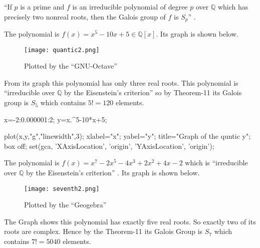 \begin{theorem}
``If \(p\) is a prime and \(f\) is an irreducible polynomial of degree \(p\) over \(\mathbb{Q}\) which has precisely two nonreal roots, then the Galois group of \(f\) is \(S_p\)'' \cite{hunger}.
\end{theorem}

\begin{example}
  The polynomial is \(f(x)=x^5-10x+5 \in \mathbb{Q}[x]\). Its graph is shown below.
  \begin{figure}[h!]
    \texttt{[image: quantic2.png]}
    \caption{\footnotesize Plotted by the ``GNU-Octave''}
  \end{figure}

 From its graph this polynomial has only three real roots. This polynomial is ``irreducible over \(\mathbb{Q}\) by the Eisenstein's criterion'' \cite{hunger} so by Theorem-11 its Galois group is \(S_5\) which contains \(5!=120\) elements.
 \end{example}

  \begin{tcolorbox}[colback=gray!20, colframe=blue!30, title={\small \bfseries \textcolor{black}{GNU-Octave Code for the above plotting}}, width=15cm]
\begin{boxedverbatim}
  x=-2:0.000001:2;
  y=x.^5-10*x+5;

  plot(x,y,"g","linewidth",3);
  xlabel="x";                     yabel="y";
  title="Graph of the quntic y";
  box off;
  set(gca, 'XAxisLocation', 'origin', 'YAxisLocation', 'origin');
\end{boxedverbatim}
  \end{tcolorbox}

\vspace{5mm}

\begin{example}
  The polynomial is \(f(x)=x^7-2x^5-4x^3+2x^2+4x-2\) which is ``irreducible over \(\mathbb{Q}\) by the Eisenstein's criterion'' \cite{hunger}. Its graph is shown below.

    \begin{figure}[h!]
    \texttt{[image: seventh2.png]}
    \caption{\footnotesize Plotted by the ``Geogebra''}
  \end{figure}
The Graph shows this polynomial has exactly five real roots. So exactly two of its roots are complex. Hence by the Theorem-11 its Galois Group is \(S_7\) which contains \(7!=5040\) elements.
\end{example}

